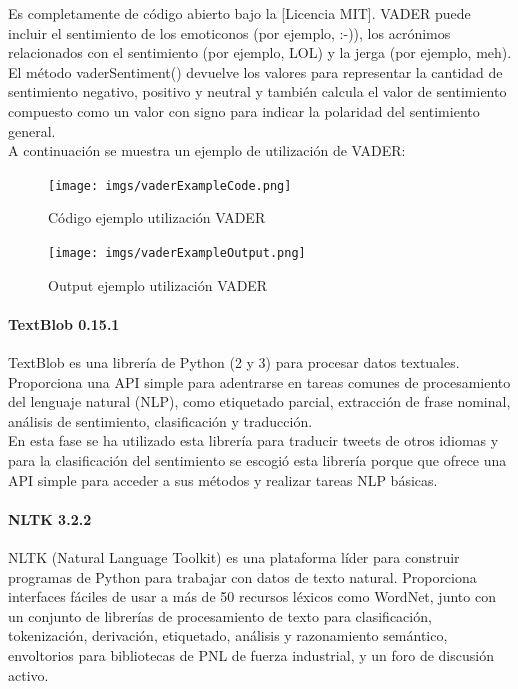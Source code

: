 \documentclass[../all.tex]{subfiles}
\begin{document}
        	 Es completamente de código abierto bajo la [Licencia MIT]. VADER puede incluir el sentimiento de los emoticonos (por ejemplo, :-)), los acrónimos relacionados con el sentimiento (por ejemplo, LOL) y la jerga (por ejemplo, meh).\\
        	 
        	 El método vaderSentiment() devuelve los valores para representar la cantidad de sentimiento negativo, positivo y neutral y también calcula el valor de sentimiento compuesto como un valor con signo para indicar la polaridad del sentimiento general.\\
        	 
        	 A continuación se muestra un ejemplo de utilización de VADER:
        	 \begin{figure}[H]
        	 	\centering
        	 	\texttt{[image: imgs/vaderExampleCode.png]}
        	 	\caption{Código ejemplo utilización VADER}
        	 \end{figure}
        	\begin{figure}[H]
        		\centering
        		\texttt{[image: imgs/vaderExampleOutput.png]}
        		\caption{Output ejemplo utilización VADER}
        	\end{figure}
        
		\newpage
        \paragraph{TextBlob 0.15.1}
        	TextBlob es una librería de Python (2 y 3) para procesar datos textuales. Proporciona una API simple para adentrarse en tareas comunes de procesamiento del lenguaje natural (NLP), como etiquetado parcial, extracción de frase nominal, análisis de sentimiento, clasificación y traducción.\\
        	
        	En esta fase se ha utilizado esta librería para traducir tweets de otros idiomas y para la clasificación del sentimiento se escogió esta librería porque que ofrece una API simple para acceder a sus métodos y realizar tareas NLP básicas.
        	
        \paragraph{NLTK 3.2.2}
			NLTK (Natural Language Toolkit) es una plataforma líder para construir programas de Python para trabajar con datos de texto natural. Proporciona interfaces fáciles de usar a más de 50 recursos léxicos como WordNet, junto con un conjunto de librerías de procesamiento de texto para clasificación, tokenización, derivación, etiquetado, análisis y razonamiento semántico, envoltorios para bibliotecas de PNL de fuerza industrial, y un foro de discusión activo.\\
			
\end{document}
